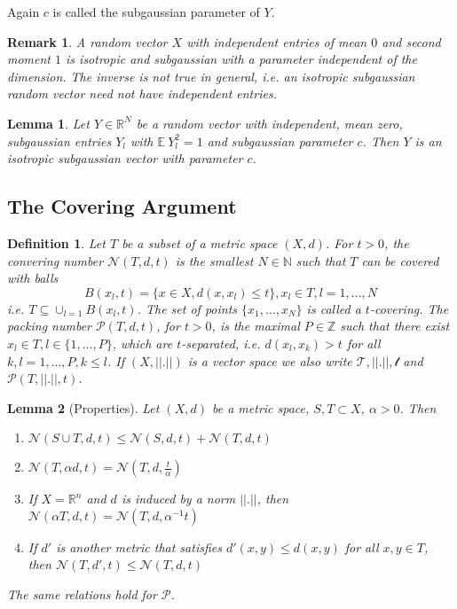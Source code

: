 \documentclass[10pt,a4paper]{article}
\theoremstyle{thmstyle}
\newtheorem{definition}{Definition}
\newtheorem{lemma}{Lemma}
\newtheorem{remark}{Remark}
\newcommand{\E}{\mathbb{E}~}
\begin{document}
Again $c$ is called the subgaussian parameter of $Y$.

\begin{remark}
  A random vector $X$ with independent entries of mean $0$ and second moment $1$ is isotropic and subgaussian with a parameter independent of the dimension.
  The inverse is not true in general, i.e. an isotropic subgaussian random vector need not have independent entries.
\end{remark}

\begin{lemma}
  Let $Y \in \mathbb{R}^{N}$ be a random vector with independent, mean zero, subgaussian entries $Y_{l}$ with $\E Y_{l}^{2} = 1$ and subgaussian parameter $c$.
  Then $Y$ is an isotropic subgaussian vector with parameter $c$.
\end{lemma}

\subsection{The Covering Argument}

\begin{definition}
  Let $T$ be a subset of a metric space $(X, d)$.
  For $t > 0$, the \emph{convering number} $\mathcal{N}(T, d, t)$ is the smallest $N \in \mathbb{N}$ such that $T$ can be covered with balls
  \begin{equation*}
    B(x_{l}, t) = \{ x \in X, d(x, x_{l}) \le t \}, x_{l} \in T, l = 1, \dots, N
  \end{equation*}
  i.e. $T \subseteq \cup_{l = 1}^{} B(x_{l}, t)$.
  The set of points $\{ x_{1}, \dots, x_{N} \}$ is called a \emph{$t$-covering}.
  The \emph{packing number} $\mathcal{P}(T, d, t)$, for $t > 0$, is the maximal $P \in \mathbb{Z}$ such that there exist $x_{l} \in T, l \in \{ 1, \dots, P \}$, which are \emph{$t$-separated}, i.e. $d(x_{l}, x_{k}) > t$ for all $k, l = 1, \dots, P, k \le l$.
  If $(X, ||.||)$ is a vector space we also write $\mathcal{T, ||.||, t}$ and $\mathcal{P}(T, ||.||, t)$.
\end{definition}

\begin{lemma}[Properties]
  Let $(X, d)$ be a metric space, $S, T \subset X$, $\alpha > 0$.
  Then
  \begin{enumerate}
  \item $\mathcal{N}(S \cup T, d, t) \le \mathcal{N}(S, d, t) + \mathcal{N}(T, d, t)$
  \item $\mathcal{N}(T, \alpha d, t) = \mathcal{N}\left( T, d, \frac{t}{\alpha} \right)$
  \item If $X = \mathbb{R}^{n}$ and $d$ is induced by a norm $||.||$, then $\mathcal{N}(\alpha T, d, t) = \mathcal{N}(T, d, \alpha^{-1} t)$
  \item If $d'$ is another metric that satisfies $d'(x, y) \le d(x, y)$ for all $x, y \in T$, then $\mathcal{N}(T, d', t) \le \mathcal{N}(T, d, t)$
  \end{enumerate}
  The same relations hold for $\mathcal{P}$.
\end{lemma}
\end{document}
